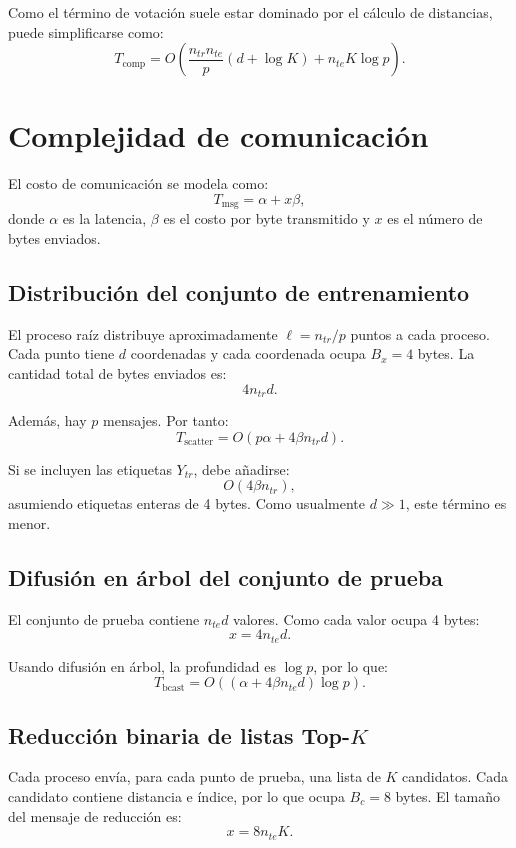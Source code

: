 \documentclass[11pt,a4paper]{article}
\begin{document}
Como el término de votación suele estar dominado por el cálculo de distancias, puede
simplificarse como:
\[
\boxed{
T_{\text{comp}}
=
O\left(
\frac{n_{tr}n_{te}}{p}(d+\log K)
+
n_{te}K\log p
\right)
}.
\]

\section{Complejidad de comunicación}

El costo de comunicación se modela como:
\[
T_{\text{msg}} = \alpha + x\beta,
\]
donde $\alpha$ es la latencia, $\beta$ es el costo por byte transmitido y $x$ es el número
de bytes enviados.

\subsection{Distribución del conjunto de entrenamiento}

El proceso raíz distribuye aproximadamente $\ell = n_{tr}/p$ puntos a cada proceso. Cada punto
tiene $d$ coordenadas y cada coordenada ocupa $B_x = 4$ bytes. La cantidad total de bytes
enviados es:
\[
4n_{tr}d.
\]

Además, hay $p$ mensajes. Por tanto:
\[
T_{\text{scatter}}
=
O(p\alpha + 4\beta n_{tr}d).
\]

Si se incluyen las etiquetas $Y_{tr}$, debe añadirse:
\[
O(4\beta n_{tr}),
\]
asumiendo etiquetas enteras de 4 bytes. Como usualmente $d \gg 1$, este término es menor.

\subsection{Difusión en árbol del conjunto de prueba}

El conjunto de prueba contiene $n_{te}d$ valores. Como cada valor ocupa 4 bytes:
\[
x = 4n_{te}d.
\]

Usando difusión en árbol, la profundidad es $\log p$, por lo que:
\[
T_{\text{bcast}}
=
O\left(
(\alpha + 4\beta n_{te}d)\log p
\right).
\]

\subsection{Reducción binaria de listas Top-$K$}

Cada proceso envía, para cada punto de prueba, una lista de $K$ candidatos. Cada candidato
contiene distancia e índice, por lo que ocupa $B_c = 8$ bytes. El tamaño del mensaje de
reducción es:
\[
x = 8n_{te}K.
\]
\end{document}
